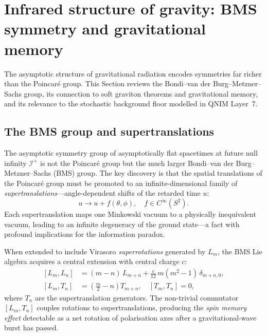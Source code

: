 \documentclass[11pt,a4paper, english]{book}
\theoremstyle{plain}
\theoremstyle{definition}
\numberwithin{equation}{chapter}
\numberwithin{figure}{chapter}
\numberwithin{table}{chapter}
\begin{document}
\section{Infrared structure of gravity: BMS symmetry and gravitational memory}
\label{app:sec:bms}
The asymptotic structure of gravitational radiation encodes symmetries far richer than the Poincaré group. This Section reviews the Bondi--van der Burg--Metzner--Sachs group, its connection to soft graviton theorems and gravitational memory, and its relevance to the stochastic background floor modelled in QNIM Layer~7.
\subsection{The BMS group and supertranslations}
\label{app:subsec:bms-group}

The asymptotic symmetry group of asymptotically flat spacetimes at future null infinity $\mathcal{I}^+$ is not the Poincar\'{e} group but the much larger Bondi--van der Burg--Metzner--Sachs (BMS) group. The key discovery \cite{Strominger_2016} is that the spatial translations of the Poincar\'{e} group must be promoted to an infinite-dimensional family of \emph{supertranslations}---angle-dependent shifts of the retarded time $u$:
\begin{equation}
  \label{eq:supertranslation}
  u \to u + f(\theta,\phi),
  \quad f \in C^\infty(S^2).
\end{equation}
Each supertranslation maps one Minkowski vacuum to a physically inequivalent vacuum, leading to an infinite degeneracy of the ground state---a fact with profound implications for the information paradox.

When extended to include Virasoro \emph{superrotations} generated by $L_m$, the BMS Lie algebra acquires a central extension with central charge $c$:
\begin{align}
  \label{eq:bms_algebra}
  [L_m, L_n] &= (m-n)\,L_{m+n} + \frac{c}{12}\,m(m^2-1)\,\delta_{m+n,0}, \\
  [L_m, T_n] &= \left(\frac{m}{2}-n\right)T_{m+n}, \quad [T_m,T_n] = 0,
\end{align}
where $T_n$ are the supertranslation generators. The non-trivial commutator $[L_m, T_n]$ couples rotations to supertranslations, producing the \emph{spin memory effect} detectable as a net rotation of polarisation axes after a gravitational-wave burst has passed.
\end{document}
